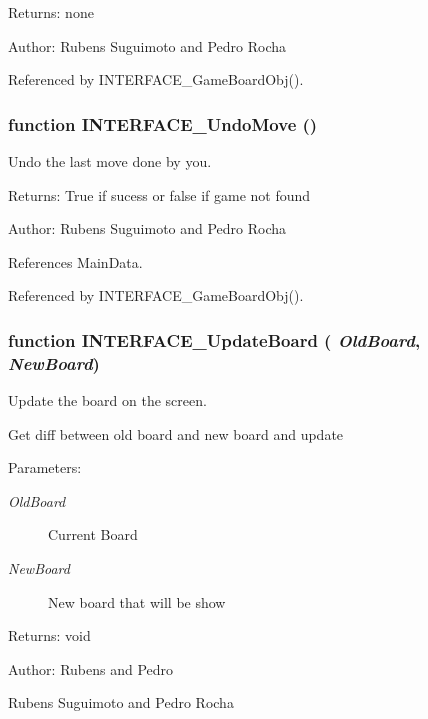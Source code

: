 \begin{Desc}
\item[Returns:]none \end{Desc}
\begin{Desc}
\item[Author:]Rubens Suguimoto and Pedro Rocha \end{Desc}


Referenced by INTERFACE\_\-GameBoardObj().
\subsubsection[INTERFACE\_\-UndoMove]{\setlength{\rightskip}{0pt plus 5cm}function INTERFACE\_\-UndoMove ()}\label{interface_2game_8js_1557b455a56a2ef129e4adaf6ad16e7b}


Undo the last move done by you. 

\begin{Desc}
\item[Returns:]True if sucess or false if game not found \end{Desc}
\begin{Desc}
\item[Author:]Rubens Suguimoto and Pedro Rocha \end{Desc}


References MainData.

Referenced by INTERFACE\_\-GameBoardObj().
\subsubsection[INTERFACE\_\-UpdateBoard]{\setlength{\rightskip}{0pt plus 5cm}function INTERFACE\_\-UpdateBoard ( {\em OldBoard}, \/   {\em NewBoard})}\label{interface_2game_8js_3b30f39254f70bb741745d4da7c43b9a}


Update the board on the screen. 

Get diff between old board and new board and update

\begin{Desc}
\item[Parameters:]
\begin{description}
\item[{\em OldBoard}]Current Board \item[{\em NewBoard}]New board that will be show \end{description}
\end{Desc}
\begin{Desc}
\item[Returns:]void \end{Desc}
\begin{Desc}
\item[Author:]Rubens and Pedro 

Rubens Suguimoto and Pedro Rocha \end{Desc}


